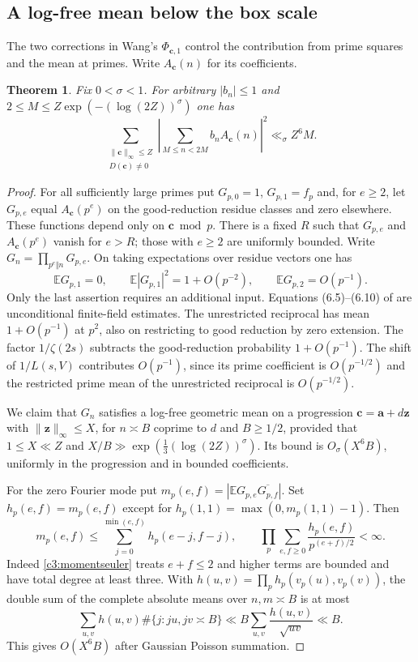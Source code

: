 \documentclass[11pt,letterpaper]{article}
\newtheorem{theorem}{Theorem}[section]
\theoremstyle{definition}
\begin{document}
\subsection{A log-free mean below the box scale}
The two corrections in Wang's $\Phi_{\mathbf c,1}$ control the
contribution from prime squares and the mean at primes. Write
$A_{\mathbf c}(n)$ for its coefficients.
\begin{theorem}\label{c3:logfreeall}
Fix $0<\sigma<1$. For arbitrary $|b_n|\le1$ and
$2\le M\le Z\exp(-(\log(2Z))^\sigma)$ one has
\[
 \sum_{\substack{\|\mathbf c\|_\infty\le Z\\D(\mathbf c)\ne0}}
   \left|\sum_{M\le n<2M} b_n A_{\mathbf c}(n)\right|^2
              \ll_\sigma Z^6 M .
\]
\end{theorem}
\begin{proof}
For all sufficiently large primes put $G_{p,0}=1$, $G_{p,1}=f_p$
and, for $e\ge2$, let $G_{p,e}$ equal $A_{\mathbf c}(p^e)$ on
the good-reduction residue classes and zero elsewhere. These
functions depend only on $\mathbf c\bmod p$. There is a fixed $R$
such that $G_{p,e}$ and $A_{\mathbf c}(p^e)$ vanish for $e>R$;
those with $e\ge2$ are uniformly bounded. Write
$G_n=\prod_{p^e\Vert n}G_{p,e}$. On taking expectations over residue
vectors one has
\begin{equation}\label{c3:momentseuler}
 \mathbb E G_{p,1}=0,\qquad
 \mathbb E |G_{p,1}|^2=1+O(p^{-2}),\qquad
 \mathbb E G_{p,2}=O(p^{-1}).
\end{equation}
Only the last assertion requires an additional input.
Equations (6.5)--(6.10) of \cite{c3:wang} are unconditional
finite-field estimates. The unrestricted reciprocal has mean
$1+O(p^{-1})$ at $p^2$, also on restricting to good reduction
by zero extension. The factor $1/\zeta(2s)$ subtracts the
good-reduction probability $1+O(p^{-1})$. The shift of $1/L(s,V)$
contributes $O(p^{-1})$, since its prime coefficient is
$O(p^{-1/2})$ and the restricted prime mean of the unrestricted
reciprocal is $O(p^{-1/2})$.

We claim that $G_n$ satisfies a log-free geometric mean on a
progression $\mathbf c=\mathbf a+d\mathbf z$ with
$\|\mathbf z\|_\infty\le X$, for $n\asymp B$ coprime to $d$
and $B\ge1/2$, provided that $1\le X\ll Z$ and
$X/B\gg\exp(\tfrac13(\log(2Z))^\sigma)$. Its bound is
$O_\sigma(X^6B)$, uniformly in the progression and in
bounded coefficients.

For the zero Fourier mode put
$m_p(e,f)=|\mathbb E G_{p,e}\overline{G_{p,f}}|$.
Set $h_p(e,f)=m_p(e,f)$ except for
$h_p(1,1)=\max(0,m_p(1,1)-1)$. Then
\[
 m_p(e,f)\le\sum_{j=0}^{\min(e,f)}h_p(e-j,f-j),\qquad
 \prod_p\sum_{e,f\ge0}\frac{h_p(e,f)}{p^{(e+f)/2}}<\infty.
\]
Indeed \eqref{c3:momentseuler} treats $e+f\le2$ and higher
terms are bounded and have total degree at least three. With
$h(u,v)=\prod_p h_p(v_p(u),v_p(v))$, the double sum of the
complete absolute means over $n,m\asymp B$ is at most
\[
 \sum_{u,v}h(u,v)\#\{j:ju,jv\asymp B\}
    \ll B\sum_{u,v}\frac{h(u,v)}{\sqrt{uv}}\ll B .
\]
This gives $O(X^6B)$ after Gaussian Poisson summation.


\end{proof}
\end{document}
